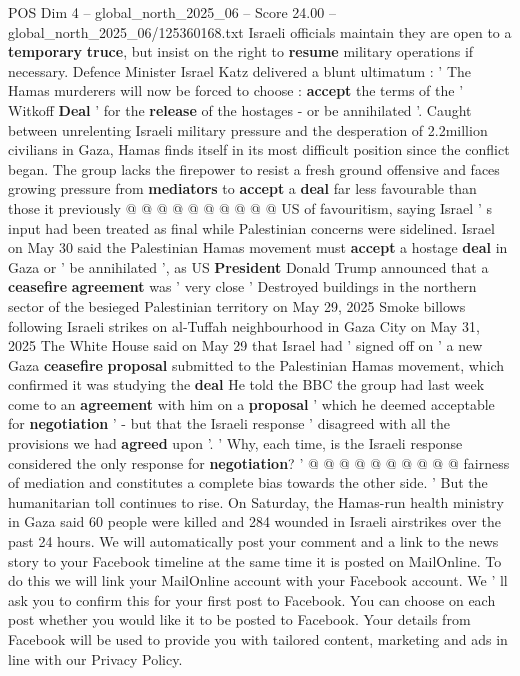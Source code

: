 \begin{textsample}{POS Dim 4 – global\_north\_2025\_06 – Score 24.00 – global\_north\_2025\_06/125360168.txt}
Israeli officials maintain they are open to a \textbf{temporary} \textbf{truce}, but insist on the right to \textbf{resume} military operations if necessary.
Defence Minister Israel Katz delivered a blunt ultimatum : ' The Hamas murderers will now be forced to choose : \textbf{accept} the terms of the ' Witkoff \textbf{Deal} ' for the \textbf{release} of the hostages - or be annihilated '.
Caught between unrelenting Israeli military pressure and the desperation of 2.2million civilians in Gaza, Hamas finds itself in its most difficult position since the conflict began.
The group lacks the firepower to resist a fresh ground offensive and faces growing pressure from \textbf{mediators} to \textbf{accept} a \textbf{deal} far less favourable than those it previously @ @ @ @ @ @ @ @ @ @ US of favouritism, saying Israel ' s input had been treated as final while Palestinian concerns were sidelined.
Israel on May 30 said the Palestinian Hamas movement must \textbf{accept} a hostage \textbf{deal} in Gaza or ' be annihilated ', as US \textbf{President} Donald Trump announced that a \textbf{ceasefire} \textbf{agreement} was ' very close ' Destroyed buildings in the northern sector of the besieged Palestinian territory on May 29, 2025 Smoke billows following Israeli strikes on al-Tuffah neighbourhood in Gaza City on May 31, 2025 The White House said on May 29 that Israel had ' signed off on ' a new Gaza \textbf{ceasefire} \textbf{proposal} submitted to the Palestinian Hamas movement, which confirmed it was studying the \textbf{deal} He told the BBC the group had last week come to an \textbf{agreement} with him on a \textbf{proposal} ' which he deemed acceptable for \textbf{negotiation} ' - but that the Israeli response ' disagreed with all the provisions we had \textbf{agreed} upon '. ' Why, each time, is the Israeli response considered the only response for \textbf{negotiation}? ' @ @ @ @ @ @ @ @ @ @ fairness of mediation and constitutes a complete bias towards the other side. ' But the humanitarian toll continues to rise.
On Saturday, the Hamas-run health ministry in Gaza said 60 people were killed and 284 wounded in Israeli airstrikes over the past 24 hours.
We will automatically post your comment and a link to the news story to your Facebook timeline at the same time it is posted on MailOnline.
To do this we will link your MailOnline account with your Facebook account.
We ' ll ask you to confirm this for your first post to Facebook.
You can choose on each post whether you would like it to be posted to Facebook.
Your details from Facebook will be used to provide you with tailored content, marketing and ads in line with our Privacy Policy.

\end{textsample}
